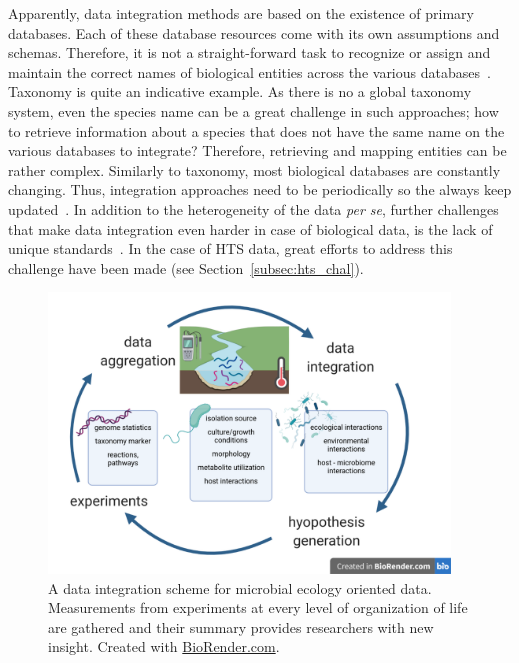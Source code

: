       Apparently, data integration methods are based on the existence of primary databases. 
      Each of these database resources come with its own assumptions and schemas. 
      Therefore, it is not a straight-forward task to recognize or assign and maintain 
      the correct names of biological entities across the various databases~\cite{stein2003integrating}.
      Taxonomy is quite an indicative example. 
      As there is no a global taxonomy system, even the species name can be a 
      great challenge in such approaches; how to retrieve information about a species
      that does not have the same name on the various databases to integrate? 
      Therefore, retrieving and mapping entities can be rather complex.  
      Similarly to taxonomy, most biological databases are constantly changing. 
      Thus, integration approaches need to be periodically so the always keep updated~\cite{stein2003integrating}.
      In addition to the heterogeneity of the data \textit{per se},
      further challenges that make data integration even harder in case of biological data,
      is the lack of unique standards~\cite{triplet2011systems}.
      In the case of HTS data, great efforts to address this challenge have been 
      made (see Section~\ref{subsec:hts_chal}).

      \begin{figure}[!h]
         \centering
         \includegraphics[width=0.95\textwidth]{figures/data_integration_scheme.png}
         \caption[Data integration in Microbial Ecology]{A data integration scheme for microbial ecology oriented data. 
         Measurements from experiments at every level of organization of life are gathered and their summary provides researchers with new insight. Created with \href{BioRender.com}{BioRender.com}.
         }
         \label{fig:data_int}
      \end{figure}


